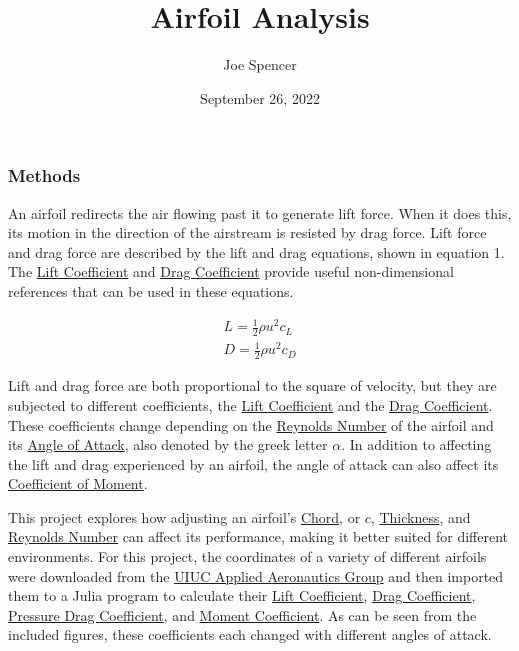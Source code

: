 \documentclass{article}
\begin{document}
\author{Joe Spencer}
\title{Airfoil Analysis}
\date{September 26, 2022}
\maketitle

\subsubsection*{Methods}

An airfoil redirects the air flowing past it to generate lift force. When it does this, its motion in the direction of the airstream is resisted by drag force. Lift force and drag force are described by the lift and drag equations, shown in equation 1. The \hyperlink{CL}{Lift Coefficient} and \hyperlink{CD}{Drag Coefficient} provide useful non-dimensional references that can be used in these equations.

\begin{equation} \label{eq:1}
\begin{aligned}
        	L = \frac{1}{2} \rho u^{2} c_{L} \\
        	D = \frac{1}{2} \rho u^{2} c_{D}
\end{aligned}
\end{equation}
	
Lift and drag force are both proportional to the square of velocity, but they are subjected to different coefficients, the \hyperlink{CL}{Lift Coefficient} and the \hyperlink{CD}{Drag Coefficient}. These coefficients change depending on the \hyperlink{Re}{Reynolds Number} of the airfoil and its \hyperlink{alpha}{Angle of Attack}, also denoted by the greek letter $\alpha$. In addition to affecting the lift and drag experienced by an airfoil, the angle of attack can also affect its \hyperlink{CM}{Coefficient of Moment}.\newline

This project explores how adjusting an airfoil's \hyperlink{c}{Chord}, or $c$, \hyperlink{Th}{Thickness}, and \hyperlink{Re}{Reynolds Number} can affect its performance, making it better suited for different environments. For this project, the coordinates of a variety of different airfoils were downloaded from the \href{https://m-selig.ae.illinois.edu/ads.html}{UIUC Applied Aeronautics Group} and then imported them to a Julia program to calculate their \hyperlink{CL}{Lift Coefficient}, \hyperlink{CD}{Drag Coefficient}, \hyperlink{DP}{Pressure Drag Coefficient}, and \hyperlink{CM}{Moment Coefficient}. As can be seen from the included figures, these coefficients each changed with different angles of attack.\newline
\end{document}
